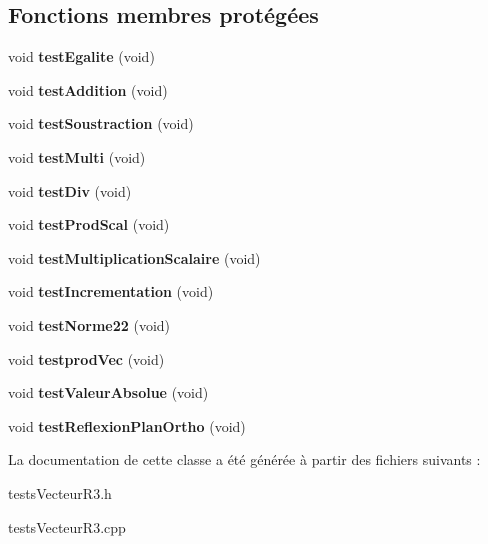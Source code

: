 \subsection*{Fonctions membres protégées}
\begin{DoxyCompactItemize}
\item 
\mbox{\label{classtests_vecteur_r3_a66335d786c01247e7e0b819046f932b5}} 
void {\bfseries test\+Egalite} (void)
\item 
\mbox{\label{classtests_vecteur_r3_af8144f37bd755b4508a9cf3e55c6a336}} 
void {\bfseries test\+Addition} (void)
\item 
\mbox{\label{classtests_vecteur_r3_a92455ad9ba84c67ef648ae6bbc58b39a}} 
void {\bfseries test\+Soustraction} (void)
\item 
\mbox{\label{classtests_vecteur_r3_ab237e20bbd4d84b88650b6c3df4bcf08}} 
void {\bfseries test\+Multi} (void)
\item 
\mbox{\label{classtests_vecteur_r3_ad55b4116890849c0eaceecf73ebe53a4}} 
void {\bfseries test\+Div} (void)
\item 
\mbox{\label{classtests_vecteur_r3_a98889d942a2a3fd943618849e950700c}} 
void {\bfseries test\+Prod\+Scal} (void)
\item 
\mbox{\label{classtests_vecteur_r3_ad587375a8995dfa2c2f4975b6ce6561f}} 
void {\bfseries test\+Multiplication\+Scalaire} (void)
\item 
\mbox{\label{classtests_vecteur_r3_a031400fd6b09207d81c0ee045bfb3fed}} 
void {\bfseries test\+Incrementation} (void)
\item 
\mbox{\label{classtests_vecteur_r3_a1bdbc486011b693f5b9f52094ab5abe0}} 
void {\bfseries test\+Norme22} (void)
\item 
\mbox{\label{classtests_vecteur_r3_ad3141a4436113f0c43e0acbd661657b4}} 
void {\bfseries testprod\+Vec} (void)
\item 
\mbox{\label{classtests_vecteur_r3_af77c000809f77101f5e421a1741cf201}} 
void {\bfseries test\+Valeur\+Absolue} (void)
\item 
\mbox{\label{classtests_vecteur_r3_a8e1b9c7fe6a23878f66fa6b82129f738}} 
void {\bfseries test\+Reflexion\+Plan\+Ortho} (void)
\end{DoxyCompactItemize}


La documentation de cette classe a été générée à partir des fichiers suivants \+:\begin{DoxyCompactItemize}
\item 
tests\+Vecteur\+R3.\+h\item 
tests\+Vecteur\+R3.\+cpp\end{DoxyCompactItemize}
